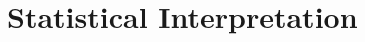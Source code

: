 \documentclass[edeposit,fullpage]{uiucthesis2009}
\begin{document}
\chapter{Statistical Interpretation}






%


%

%

%

%

%

\appendix
%


\backmatter


%

\end{document}
